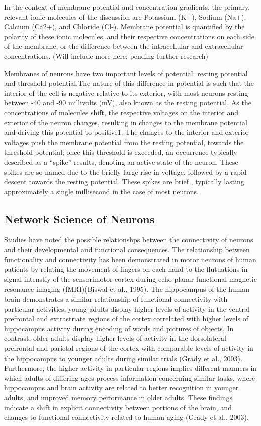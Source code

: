 \documentclass{article}
\begin{document}
In the context of membrane potential and concentration gradients, the primary, relevant ionic molecules of the discussion are Potassium (K+), Sodium (Na+), Calcium (Ca2+), and Chloride (Cl-). Membrane potential is quantified by the polarity of these ionic molecules, and their respective concentrations on each side of the membrane, or the difference between the intracellular and extracellular concentrations. (Will include more here; pending further research)\par
Membranes of neurons have two important levels of potential: resting potential and threshold potential.The nature of this difference in potential is such that the interior of the cell is negative relative to its exterior, with most neurons resting between -40 and -90 millivolts (mV), also known as the resting potential. As the concentrations of molecules shift, the respective voltages on the interior and exterior of the neuron changes, resulting in changes to the membrane potential and driving this potential to positive1. The changes to the interior and exterior voltages push the membrane potential from the resting potential, towards the threshold potential; once this threshold is exceeded, an occurrence typically described as a “spike” results, denoting an active state of the neuron. These spikes are so named due to the briefly large rise in voltage, followed by a rapid descent towards the resting potential. These spikes are brief , typically lasting approximately a single millisecond in the case of most neurons.\par 

\subsection{Network Science of Neurons}
Studies have noted the possible relationshps between the connectivity of neurons and their developmental and functional consequences. The relationship between functionality and connectivity has been demonstrated in motor neurons of human patients by relating the movement of fingers on each hand to the flutuations in signal intenstiy of the sensorimotor cortex during echo-planar functional magnetic resonance imaging (fMRI)(Biswal et al., 1995). The hippocampus of the human brain demonstrates a similar relationship of functional connectivity with particular activities; young adults display higher levels of activity in the ventral prefrontal and extrastriate regions of the cortex correlated with higher levels of hippocampus activity during  encoding of words and pictures of objects. In contrast, older adults display higher levels of activity in the dorsolateral prefrontal and parietal regions of the cortex with comparable levels of activity in the hippocampus to younger adults during similar trials (Grady et al., 2003). Furthermore, the higher activity in particular regions implies different manners in which adults of differing ages process information concerning similar tasks, where hippocampus and brain activity are related to better recognition in younger adults, and improved memory performance in older adults. These findings indicate a shift in explicit connectivity between portions of the brain, and changes to functional connectivity related to human aging (Grady et al., 2003).
\end{document}
